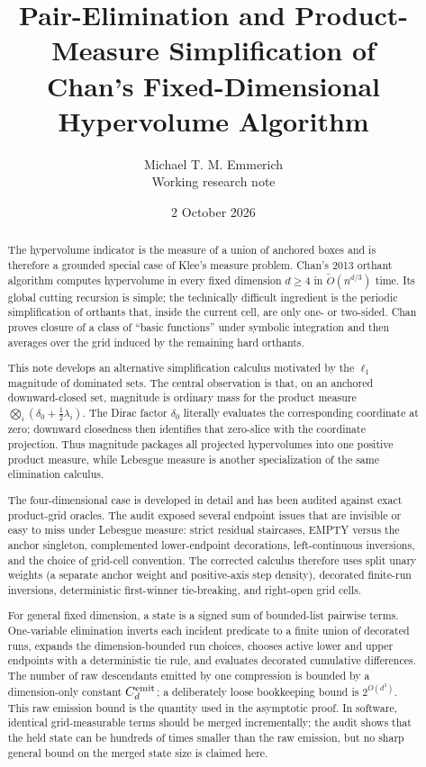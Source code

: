 \documentclass[12pt,a4paper]{article}
\title{Pair-Elimination and Product-Measure Simplification of\\Chan's Fixed-Dimensional Hypervolume Algorithm}
\author{Michael T. M. Emmerich\\\small Working research note}
\date{2 October 2026}
\theoremstyle{definition}
\newcommand{\1}{\mathbf 1}
\begin{document}
\maketitle

\begin{abstract}
The hypervolume indicator is the measure of a union of anchored boxes and is therefore a grounded special case of Klee's measure problem. Chan's 2013 orthant algorithm computes hypervolume in every fixed dimension $d\ge4$ in $\widetilde O(n^{d/3})$ time. Its global cutting recursion is simple; the technically difficult ingredient is the periodic simplification of orthants that, inside the current cell, are only one- or two-sided. Chan proves closure of a class of ``basic functions'' under symbolic integration and then averages over the grid induced by the remaining hard orthants.

This note develops an alternative simplification calculus motivated by the $\ell_1$ magnitude of dominated sets. The central observation is that, on an anchored downward-closed set, magnitude is ordinary mass for the product measure $\bigotimes_i(\delta_0+\tfrac12\lambda_i)$. The Dirac factor $\delta_0$ literally evaluates the corresponding coordinate at zero; downward closedness then identifies that zero-slice with the coordinate projection. Thus magnitude packages all projected hypervolumes into one positive product measure, while Lebesgue measure is another specialization of the same elimination calculus.

The four-dimensional case is developed in detail and has been audited against exact product-grid oracles. The audit exposed several endpoint issues that are invisible or easy to miss under Lebesgue measure: strict residual staircases, EMPTY versus the anchor singleton, complemented lower-endpoint decorations, left-continuous inversions, and the choice of grid-cell convention. The corrected calculus therefore uses split unary weights (a separate anchor weight and positive-axis step density), decorated finite-run inversions, deterministic first-winner tie-breaking, and right-open grid cells.

For general fixed dimension, a state is a signed sum of bounded-list pairwise terms. One-variable elimination inverts each incident predicate to a finite union of decorated runs, expands the dimension-bounded run choices, chooses active lower and upper endpoints with a deterministic tie rule, and evaluates decorated cumulative differences. The number of raw descendants emitted by one compression is bounded by a dimension-only constant $C_d^{\rm emit}$; a deliberately loose bookkeeping bound is $2^{O(d^3)}$. This raw emission bound is the quantity used in the asymptotic proof. In software, identical grid-measurable terms should be merged incrementally; the audit shows that the held state can be hundreds of times smaller than the raw emission, but no sharp general bound on the merged state size is claimed here.


\end{abstract}
\end{document}
